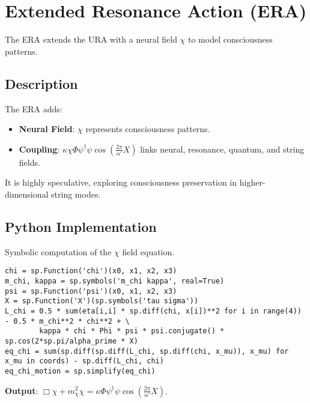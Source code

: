 \documentclass[12pt]{article}
\begin{document}
\section*{Extended Resonance Action (ERA)}

The ERA extends the URA with a neural field \(\chi\) to model consciousness patterns.

\begin{tcolorbox}[colback=green!5!white, colframe=green!75!black, title=Extended Action]
\end{tcolorbox}

\subsection*{Description}
The ERA adds:
\begin{itemize}
    \item \textbf{Neural Field}: \(\chi\) represents consciousness patterns.
    \item \textbf{Coupling}: \(\kappa \chi \Phi \psi^\dagger \psi \cos\left( \frac{2\pi}{\alpha'} X \right)\) links neural, resonance, quantum, and string fields.
\end{itemize}
It is highly speculative, exploring consciousness preservation in higher-dimensional string modes.

\subsection*{Python Implementation}
Symbolic computation of the \(\chi\) field equation.

\begin{lstlisting}
chi = sp.Function('chi')(x0, x1, x2, x3)
m_chi, kappa = sp.symbols('m_chi kappa', real=True)
psi = sp.Function('psi')(x0, x1, x2, x3)
X = sp.Function('X')(sp.symbols('tau sigma'))
L_chi = 0.5 * sum(eta[i,i] * sp.diff(chi, x[i])**2 for i in range(4)) - 0.5 * m_chi**2 * chi**2 + \
        kappa * chi * Phi * psi * psi.conjugate() * sp.cos(2*sp.pi/alpha_prime * X)
eq_chi = sum(sp.diff(sp.diff(L_chi, sp.diff(chi, x_mu)), x_mu) for x_mu in coords) - sp.diff(L_chi, chi)
eq_chi_motion = sp.simplify(eq_chi)
\end{lstlisting}
\textbf{Output}: \(\Box \chi + m_\chi^2 \chi = \kappa \Phi \psi^\dagger \psi \cos\left( \frac{2\pi}{\alpha'} X \right)\).
\end{document}
